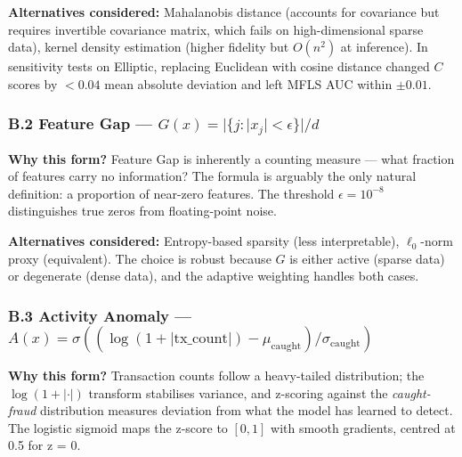 \documentclass[
  11pt,
]{article}
\begin{document}
\textbf{Alternatives considered:} Mahalanobis distance (accounts for
covariance but requires invertible covariance matrix, which fails on
high-dimensional sparse data), kernel density estimation (higher
fidelity but \(O(n^2)\) at inference). In sensitivity tests on Elliptic,
replacing Euclidean with cosine distance changed \(C\) scores by
\(<0.04\) mean absolute deviation and left MFLS AUC within \(\pm 0.01\).

\subsubsection{\texorpdfstring{B.2 Feature Gap —
\(G(x) = |\{j : |x_j| < \epsilon\}| / d\)}{B.2 Feature Gap — G(x) = \textbar\textbackslash\{j : \textbar x\_j\textbar{} \textless{} \textbackslash epsilon\textbackslash\}\textbar{} / d}}\label{b.2-feature-gap-gx-j-x_j-epsilon-d}

\textbf{Why this form?} Feature Gap is inherently a counting measure —
what fraction of features carry no information? The formula is arguably
the only natural definition: a proportion of near-zero features. The
threshold \(\epsilon = 10^{-8}\) distinguishes true zeros from
floating-point noise.

\textbf{Alternatives considered:} Entropy-based sparsity (less
interpretable), \(\ell_0\)-norm proxy (equivalent). The choice is robust
because \(G\) is either active (sparse data) or degenerate (dense data),
and the adaptive weighting handles both cases.

\subsubsection{\texorpdfstring{B.3 Activity Anomaly —
\(A(x) = \sigma\!\left((\log(1 + |\text{tx\_count}|) - \mu_{\text{caught}}) / \sigma_{\text{caught}}\right)\)}{B.3 Activity Anomaly — A(x) = \textbackslash sigma\textbackslash!\textbackslash left((\textbackslash log(1 + \textbar\textbackslash text\{tx\textbackslash\_count\}\textbar) - \textbackslash mu\_\{\textbackslash text\{caught\}\}) / \textbackslash sigma\_\{\textbackslash text\{caught\}\}\textbackslash right)}}\label{b.3-activity-anomaly-ax-sigmaleftlog1-texttx_count---mu_textcaught-sigma_textcaughtright}

\textbf{Why this form?} Transaction counts follow a heavy-tailed
distribution; the \(\log(1+|\cdot|)\) transform stabilises variance, and
z-scoring against the \emph{caught-fraud} distribution measures
deviation from what the model has learned to detect. The logistic
sigmoid maps the z-score to \([0,1]\) with smooth gradients, centred at
0.5 for z = 0.
\end{document}
